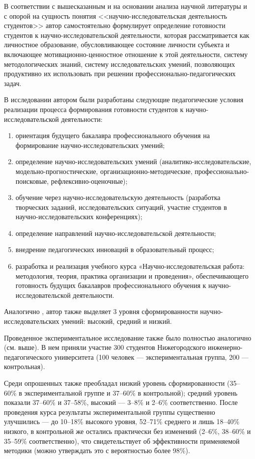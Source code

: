 \documentclass[oneside]{scrartcl}
\begin{document}
В соответствии с вышесказанным и на основании анализа научной литературы и с опорой на сущность понятия 
<<научно-исследовательская деятельность студентов>> автор самостоятельно формулирует определение готовности студентов к
научно-исследовательской деятельности, которая рассматривается как личностное образование, обусловливающее состояние личности
субъекта и включающее мотивационно-ценностное отношение к этой деятельности, систему методологических знаний, систему
исследовательских умений, позволяющих продуктивно их использовать при решении профессионально-педагогических задач.

В исследовании автором были разработаны следующие педагогические условия реализации процесса формирования готовности студентов к
научно-исследовательской деятельности:

\begin{enumerate}[1)]
\item  ориентация будущего бакалавра профессионального обучения на формирование научно-исследовательских умений;
\item определение научно-исследовательских умений (аналитико-исследовательские, модельно-прогностические,
организационно-методические, профессионально-поисковые, рефлексивно-оценочные);
\item обучение через научно-исследовательскую деятельность (разработка творческих заданий, исследовательских ситуаций,
участие студентов в научно-исследовательских конференциях);
\item определение направлений научно-исследовательской деятельности;
\item внедрение педагогических инноваций в образовательный процесс;
\item разработка и реализация учебного курса «Научно-исследовательская работа: методология, теория, практика организации и
проведения», обеспечивающего готовность будущих бакалавров профессионального обучения к научно-исследовательской деятельности.
\end{enumerate}

Аналогично \cite{prohorova}, автор также выделяет 3 уровня сформированности научно-исследовательских умений: высокий, средний
и низкий.

Проведенное экспериментальное исследование также было полностью аналогично \cite{prohorova} (см. выше). В нем приняли
участие 300 студентов Нижегородского инженерно-педагогического университета (100 человек --- экспериментальная группа, 
200 --- контрольная).

Среди опрошенных также преобладал низкий уровень сформированности (35--60\% в экспериментальной группе и 37--60\% в контрольной);
средний уровень показали 37--60\% и 37--58\%, высокий --- 3--8\% и 2--6\% соответственно. После проведения курса результаты
экспериментальной группы существенно улучшились --- до 10--18\% высокого уровня, 52--71\% среднего и лишь 18--40\% низкого,
в контрольной же остались практически без изменений (2--6\%, 38--60\% и 35--59\% соответственно), что свидетельствует
об эффективности применяемой методики (можно утверждать это с вероятностью более 98\%).
\end{document}
